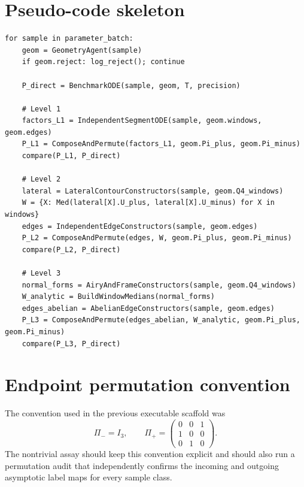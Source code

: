 \documentclass[11pt]{article}
\begin{document}
\section{Pseudo-code skeleton}
\begin{verbatim}
for sample in parameter_batch:
    geom = GeometryAgent(sample)
    if geom.reject: log_reject(); continue

    P_direct = BenchmarkODE(sample, geom, T, precision)

    # Level 1
    factors_L1 = IndependentSegmentODE(sample, geom.windows, geom.edges)
    P_L1 = ComposeAndPermute(factors_L1, geom.Pi_plus, geom.Pi_minus)
    compare(P_L1, P_direct)

    # Level 2
    lateral = LateralContourConstructors(sample, geom.Q4_windows)
    W = {X: Med(lateral[X].U_plus, lateral[X].U_minus) for X in windows}
    edges = IndependentEdgeConstructors(sample, geom.edges)
    P_L2 = ComposeAndPermute(edges, W, geom.Pi_plus, geom.Pi_minus)
    compare(P_L2, P_direct)

    # Level 3
    normal_forms = AiryAndFrameConstructors(sample, geom.Q4_windows)
    W_analytic = BuildWindowMedians(normal_forms)
    edges_abelian = AbelianEdgeConstructors(sample, geom.edges)
    P_L3 = ComposeAndPermute(edges_abelian, W_analytic, geom.Pi_plus, geom.Pi_minus)
    compare(P_L3, P_direct)
\end{verbatim}

\section{Endpoint permutation convention}
The convention used in the previous executable scaffold was
\begin{equation}
\Pi_-=I_3,
\qquad
\Pi_+=\begin{pmatrix}0&0&1\\1&0&0\\0&1&0\end{pmatrix}.
\end{equation}
The nontrivial assay should keep this convention explicit and should also run a permutation audit that independently confirms the incoming and outgoing asymptotic label maps for every sample class.
\end{document}
